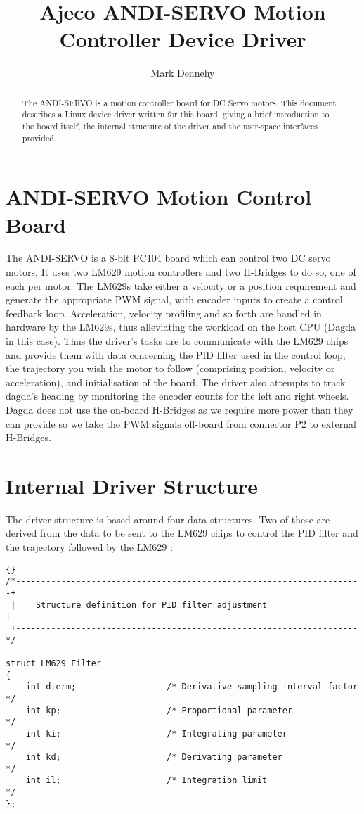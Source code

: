 \documentclass[a4paper,11pt]{article}
\title{Ajeco ANDI-SERVO Motion Controller Device Driver}
\author{Mark Dennehy}
\begin{document}

\maketitle

\begin{abstract}
The ANDI-SERVO is a motion controller board for DC Servo motors. This
document describes a Linux device driver written for this board, giving
a brief introduction to the board itself, the internal structure of the
driver and the user-space interfaces provided.
\end{abstract}

\part{ANDI-SERVO Motion Control Board}

The ANDI-SERVO is a 8-bit PC104 board which can control two DC servo
motors. It uses two LM629 motion controllers and two H-Bridges to do so,
one of each per motor. 
The LM629s take either a velocity or a position requirement and generate
the appropriate PWM signal, with encoder inputs to create a control
feedback loop. Acceleration, velocity profiling and so forth are handled
in hardware by the LM629s, thus alleviating the workload on the host CPU
(Dagda in this case). Thus the driver's tasks are to communicate with
the LM629 chips and provide them with data concerning the PID filter
used in the control loop, the trajectory you wish the motor to follow
(comprising position, velocity or acceleration), and initialisation
of the board. The driver also attempts to track dagda's heading by
monitoring the encoder counts for the left and right wheels.
Dagda does not use the on-board
H-Bridges as we require more power than they can provide so we
take the PWM signals off-board from connector P2 to external H-Bridges.

\part{Internal Driver Structure}

The driver structure is based around four data structures. Two of these
are derived from the data to be sent to the LM629 chips to control the
PID filter and the trajectory followed by the LM629 :

\begin{lstlisting}{}
/*---------------------------------------------------------------------+
 |    Structure definition for PID filter adjustment                   |
 +--------------------------------------------------------------------*/

struct LM629_Filter
{
	int dterm;					/* Derivative sampling interval factor  */
	int kp;						/* Proportional parameter               */
	int ki;						/* Integrating parameter                */
	int kd;						/* Derivating parameter                 */
	int il;						/* Integration limit                    */
};
\end{lstlisting}
\end{document}
